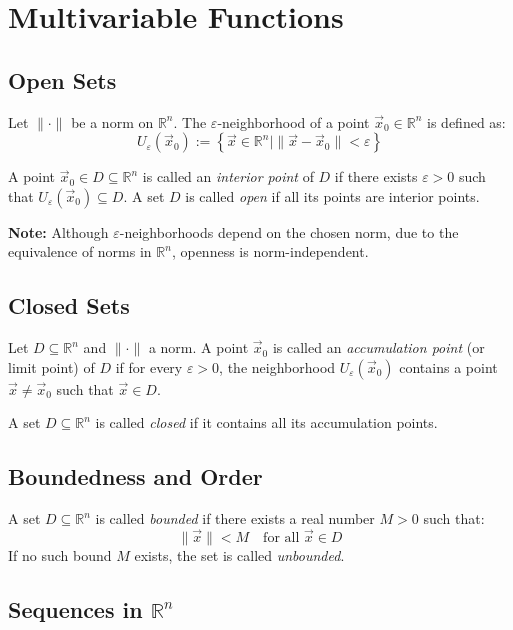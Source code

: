 \section{Multivariable Functions}

\subsection{Open Sets}

Let \( \| \cdot \| \) be a norm on \( \mathbb{R}^n \). The \( \varepsilon \)-neighborhood of a point \( \vec{x}_0 \in \mathbb{R}^n \) is defined as:
\[
U_\varepsilon(\vec{x}_0) := \left\{ \vec{x} \in \mathbb{R}^n \mid \| \vec{x} - \vec{x}_0 \| < \varepsilon \right\}
\]

A point \( \vec{x}_0 \in D \subseteq \mathbb{R}^n \) is called an \emph{interior point} of \( D \) if there exists \( \varepsilon > 0 \) such that \( U_\varepsilon(\vec{x}_0) \subseteq D \).  
A set \( D \) is called \emph{open} if all its points are interior points.

\textbf{Note:} Although \( \varepsilon \)-neighborhoods depend on the chosen norm, due to the equivalence of norms in \( \mathbb{R}^n \), openness is norm-independent.


\subsection{Closed Sets}

Let \( D \subseteq \mathbb{R}^n \) and \( \| \cdot \| \) a norm. A point \( \vec{x}_0 \) is called an \emph{accumulation point} (or limit point) of \( D \) if for every \( \varepsilon > 0 \), the neighborhood \( U_\varepsilon(\vec{x}_0) \) contains a point \( \vec{x} \ne \vec{x}_0 \) such that \( \vec{x} \in D \).

A set \( D \subseteq \mathbb{R}^n \) is called \emph{closed} if it contains all its accumulation points.

\subsection{Boundedness and Order}

A set \( D \subseteq \mathbb{R}^n \) is called \emph{bounded} if there exists a real number \( M > 0 \) such that:
\[
\|\vec{x}\| < M \quad \text{for all } \vec{x} \in D
\]
If no such bound \( M \) exists, the set is called \emph{unbounded}.


\subsection{Sequences in \( \mathbb{R}^n \)}

